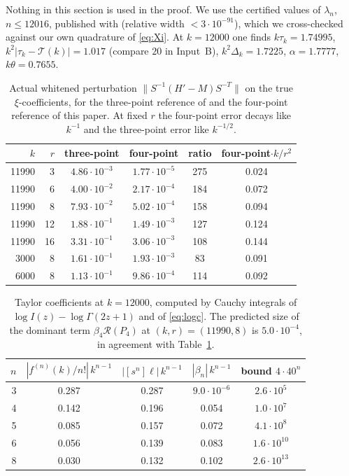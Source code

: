 \documentclass[11pt,a4paper]{article}
\numberwithin{equation}{section}
\theoremstyle{definition}
\theoremstyle{remark}
\newcommand{\cR}{\mathcal R}
\newcommand{\cT}{\mathcal T}
\begin{document}
Nothing in this section is used in the proof. We use the certified values of $\lambda_n$, $n\le12016$, published
with \cite{LM} (relative width $<3\cdot10^{-91}$), which we cross-checked against our own quadrature of \eqref{eq:Xi}.
At $k=12000$ one finds $k\tau_k=1.74995$, $k^2|\tau_k-\cT(k)|=1.017$ (compare $20$ in Input~B), $k^2\Delta_k=1.7225$,
$\alpha=1.7777$, $k\theta=0.7655$.

\begin{table}[h]
\centering
\begin{tabular}{rrcccc}
\toprule
$k$ & $r$ & three-point & four-point & ratio & four-point$\cdot k/r^2$\\
\midrule
11990 & 3 & $4.86\cdot10^{-3}$ & $1.77\cdot10^{-5}$ & 275 & 0.024\\
11990 & 6 & $4.00\cdot10^{-2}$ & $2.17\cdot10^{-4}$ & 184 & 0.072\\
11990 & 8 & $7.93\cdot10^{-2}$ & $5.02\cdot10^{-4}$ & 158 & 0.094\\
11990 & 12 & $1.88\cdot10^{-1}$ & $1.49\cdot10^{-3}$ & 127 & 0.124\\
11990 & 16 & $3.31\cdot10^{-1}$ & $3.06\cdot10^{-3}$ & 108 & 0.144\\
\midrule
3000 & 8 & $1.61\cdot10^{-1}$ & $1.93\cdot10^{-3}$ & 83 & 0.091\\
6000 & 8 & $1.13\cdot10^{-1}$ & $9.86\cdot10^{-4}$ & 114 & 0.092\\
\bottomrule
\end{tabular}
\caption{Actual whitened perturbation $\|S^{-1}(H'-M)S^{-T}\|$ on the true $\xi$-coefficients, for the three-point
reference of \cite{Mich} and the four-point reference of this paper. At fixed $r$ the four-point error decays like $k^{-1}$
and the three-point error like $k^{-1/2}$.}
\label{tab:whitened}
\end{table}

\begin{table}[h]
\centering
\begin{tabular}{rcccc}
\toprule
$n$ & $|f^{(n)}(k)/n!|\,k^{n-1}$ & $|[s^n]\ell|\,k^{n-1}$ & $|\beta_n|\,k^{n-1}$ & bound $4\cdot40^n$\\
\midrule
3 & 0.287 & 0.287 & $9.0\cdot10^{-6}$ & $2.6\cdot10^{5}$\\
4 & 0.142 & 0.196 & 0.054 & $1.0\cdot10^{7}$\\
5 & 0.085 & 0.157 & 0.072 & $4.1\cdot10^{8}$\\
6 & 0.056 & 0.139 & 0.083 & $1.6\cdot10^{10}$\\
8 & 0.030 & 0.132 & 0.102 & $2.6\cdot10^{13}$\\
\bottomrule
\end{tabular}
\caption{Taylor coefficients at $k=12000$, computed by Cauchy integrals of $\log I(z)-\log\Gamma(2z+1)$ and of \eqref{eq:logc}.
The predicted size of the dominant term $\beta_4\cR(P_4)$ at $(k,r)=(11990,8)$ is $5.0\cdot10^{-4}$, in agreement with
Table~\ref{tab:whitened}.}
\label{tab:taylor}
\end{table}
\end{document}
